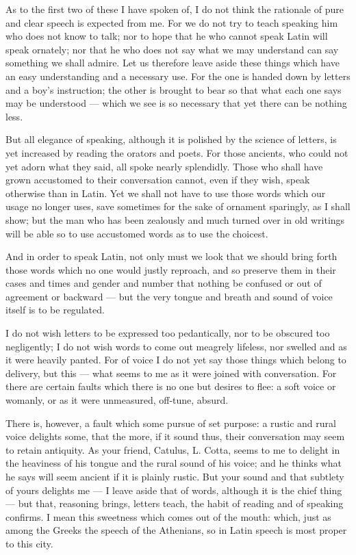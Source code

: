  As to the first two of these I have spoken of, I do not think the rationale of pure and clear speech is expected from me. For we do not try to teach speaking him who does not know to talk; nor to hope that he who cannot speak Latin will speak ornately; nor that he who does not say what we may understand can say something we shall admire. Let us therefore leave aside these things which have an easy understanding and a necessary use. For the one is handed down by letters and a boy's instruction; the other is brought to bear so that what each one says may be understood — which we see is so necessary that yet there can be nothing less.

 But all elegance of speaking, although it is polished by the science of letters, is yet increased by reading the orators and poets. For those ancients, who could not yet adorn what they said, all spoke nearly splendidly. Those who shall have grown accustomed to their conversation cannot, even if they wish, speak otherwise than in Latin. Yet we shall not have to use those words which our usage no longer uses, save sometimes for the sake of ornament sparingly, as I shall show; but the man who has been zealously and much turned over in old writings will be able so to use accustomed words as to use the choicest.

 And in order to speak Latin, not only must we look that we should bring forth those words which no one would justly reproach, and so preserve them in their cases and times and gender and number that nothing be confused or out of agreement or backward — but the very tongue and breath and sound of voice itself is to be regulated.

 I do not wish letters to be expressed too pedantically, nor to be obscured too negligently; I do not wish words to come out meagrely lifeless, nor swelled and as it were heavily panted. For of voice I do not yet say those things which belong to delivery, but this — what seems to me as it were joined with conversation. For there are certain faults which there is no one but desires to flee: a soft voice or womanly, or as it were unmeasured, off-tune, absurd.

 There is, however, a fault which some pursue of set purpose: a rustic and rural voice delights some, that the more, if it sound thus, their conversation may seem to retain antiquity. As your friend, Catulus, L. Cotta, seems to me to delight in the heaviness of his tongue and the rural sound of his voice; and he thinks what he says will seem ancient if it is plainly rustic. But your sound and that subtlety of yours delights me — I leave aside that of words, although it is the chief thing — but that, reasoning brings, letters teach, the habit of reading and of speaking confirms. I mean this sweetness which comes out of the mouth: which, just as among the Greeks the speech of the Athenians, so in Latin speech is most proper to this city.

